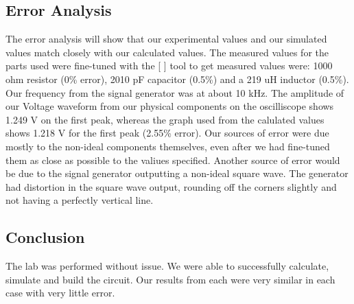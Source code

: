 \documentclass[11pt]{article}
\begin{document}
	\subsection*{Error Analysis}
	The error analysis will show that our experimental values and our simulated values match closely with our calculated values. The measured values for the parts used were fine-tuned with the [    ] tool to get measured values were: 1000 ohm resistor (0\% error), 2010 pF capacitor (0.5\%) and a 219 uH inductor (0.5\%). Our frequency from the signal generator was at about 10 kHz. 
	The amplitude of our Voltage waveform from our physical components on the oscilliscope shows 1.249 V on the first peak, whereas the graph used from the calulated values shows 1.218 V for the first peak (2.55\% error). 
	Our sources of error were due mostly to the non-ideal components themselves, even after we had fine-tuned them as close as possible to the valiues specified. Another source of error would be due to the signal generator outputting a non-ideal square wave. The generator had distortion in the square wave output, rounding off the corners slightly and not having a perfectly vertical line.  
	\subsection*{Conclusion}
	The lab was performed without issue. We were able to successfully calculate, simulate and build the circuit. Our results from each were very similar in each case with very little error.  
\end{document}
